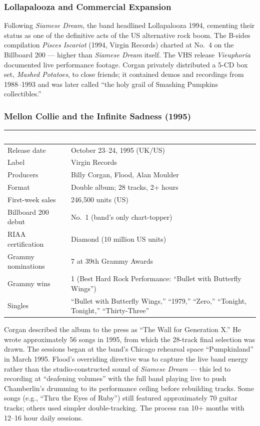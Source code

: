 \documentclass[11pt,letterpaper]{article}
\newcommand{\tableheader}[1]{\textbf{\sffamily\textcolor{white}{#1}}}
\begin{document}
\subsubsection{Lollapalooza and Commercial Expansion}

Following \textit{Siamese Dream}, the band headlined Lollapalooza 1994, cementing their status as one of the definitive acts of the US alternative rock boom. The B-sides compilation \textit{Pisces Iscariot} (1994, Virgin Records) charted at No.\ 4 on the Billboard 200 --- higher than \textit{Siamese Dream} itself. The VHS release \textit{Vieuphoria} documented live performance footage. Corgan privately distributed a 5-CD box set, \textit{Mashed Potatoes}, to close friends; it contained demos and recordings from 1988--1993 and was later called ``the holy grail of Smashing Pumpkins collectibles.''

\subsubsection{Mellon Collie and the Infinite Sadness (1995)}

\begin{center}
\begin{tabularx}{\textwidth}{L{3.5cm}X}
\toprule
{}
\tableheader{Attribute} & \tableheader{Data} \\
\midrule
Release date & October 23--24, 1995 (UK/US) \\
Label & Virgin Records \\
Producers & Billy Corgan, Flood, Alan Moulder \\
Format & Double album; 28 tracks, 2+ hours \\
First-week sales & 246,500 units (US) \\
Billboard 200 debut & No.\ 1 (band's only chart-topper) \\
RIAA certification & Diamond (10 million US units) \\
Grammy nominations & 7 at 39th Grammy Awards \\
Grammy wins & 1 (Best Hard Rock Performance: ``Bullet with Butterfly Wings'') \\
Singles & ``Bullet with Butterfly Wings,'' ``1979,'' ``Zero,'' ``Tonight, Tonight,'' ``Thirty-Three'' \\
\bottomrule
\end{tabularx}
\end{center}

Corgan described the album to the press as ``The Wall for Generation X.'' He wrote approximately 56 songs in 1995, from which the 28-track final selection was drawn. The sessions began at the band's Chicago rehearsal space ``Pumpkinland'' in March 1995. Flood's overriding directive was to capture the live band energy rather than the studio-constructed sound of \textit{Siamese Dream} --- this led to recording at ``deafening volumes'' with the full band playing live to push Chamberlin's drumming to its performance ceiling before rebuilding tracks. Some songs (e.g., ``Thru the Eyes of Ruby'') still featured approximately 70 guitar tracks; others used simpler double-tracking. The process ran 10+ months with 12--16 hour daily sessions.
\end{document}
